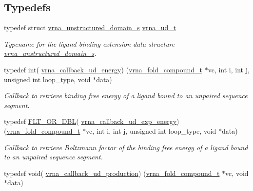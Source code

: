 \subsection*{Typedefs}
\begin{DoxyCompactItemize}
\item 
typedef struct \hyperlink{group__domains__up_structvrna__unstructured__domain__s}{vrna\+\_\+unstructured\+\_\+domain\+\_\+s} \hyperlink{group__domains__up_ga0009117b14d29143e8b18ab891f48c2d}{vrna\+\_\+ud\+\_\+t}\hypertarget{group__domains__up_ga0009117b14d29143e8b18ab891f48c2d}{}\label{group__domains__up_ga0009117b14d29143e8b18ab891f48c2d}

\begin{DoxyCompactList}\small\item\em Typename for the ligand binding extension data structure \hyperlink{group__domains__up_structvrna__unstructured__domain__s}{vrna\+\_\+unstructured\+\_\+domain\+\_\+s}. \end{DoxyCompactList}\item 
typedef int( \hyperlink{group__domains__up_ga60a2244cf1415fd076cc0dba92c2a96d}{vrna\+\_\+callback\+\_\+ud\+\_\+energy}) (\hyperlink{group__fold__compound_ga1b0cef17fd40466cef5968eaeeff6166}{vrna\+\_\+fold\+\_\+compound\+\_\+t} $\ast$vc, int i, int j, unsigned int loop\+\_\+type, void $\ast$data)\hypertarget{group__domains__up_ga60a2244cf1415fd076cc0dba92c2a96d}{}\label{group__domains__up_ga60a2244cf1415fd076cc0dba92c2a96d}

\begin{DoxyCompactList}\small\item\em Callback to retrieve binding free energy of a ligand bound to an unpaired sequence segment. \end{DoxyCompactList}\item 
typedef \hyperlink{group__data__structures_ga31125aeace516926bf7f251f759b6126}{F\+L\+T\+\_\+\+O\+R\+\_\+\+D\+BL}( \hyperlink{group__domains__up_ga79eb0224b0b6e0a86c9e8c4a1b0cad04}{vrna\+\_\+callback\+\_\+ud\+\_\+exp\+\_\+energy}) (\hyperlink{group__fold__compound_ga1b0cef17fd40466cef5968eaeeff6166}{vrna\+\_\+fold\+\_\+compound\+\_\+t} $\ast$vc, int i, int j, unsigned int loop\+\_\+type, void $\ast$data)\hypertarget{group__domains__up_ga79eb0224b0b6e0a86c9e8c4a1b0cad04}{}\label{group__domains__up_ga79eb0224b0b6e0a86c9e8c4a1b0cad04}

\begin{DoxyCompactList}\small\item\em Callback to retrieve Boltzmann factor of the binding free energy of a ligand bound to an unpaired sequence segment. \end{DoxyCompactList}\item 
typedef void( \hyperlink{group__domains__up_ga5cb14c4f2149c3df9842a709d6d64140}{vrna\+\_\+callback\+\_\+ud\+\_\+production}) (\hyperlink{group__fold__compound_ga1b0cef17fd40466cef5968eaeeff6166}{vrna\+\_\+fold\+\_\+compound\+\_\+t} $\ast$vc, void $\ast$data)\hypertarget{group__domains__up_ga5cb14c4f2149c3df9842a709d6d64140}{}\label{group__domains__up_ga5cb14c4f2149c3df9842a709d6d64140}


\end{DoxyCompactItemize}
